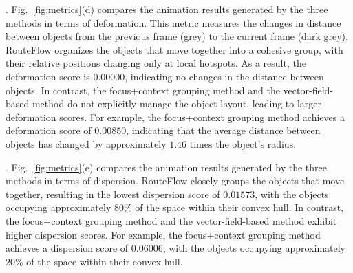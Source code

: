 .
Fig.~\ref{fig:metrics}(d) compares the animation results generated by the three methods in terms of deformation. 
This metric measures the changes in distance between objects from the previous frame (grey) to the current frame (dark grey).
RouteFlow organizes the objects that move together into a cohesive group, with their relative positions changing only at local hotspots.
As a result, the deformation score is $0.00000$, indicating no changes in the distance between objects.
In contrast, the focus+context grouping method and the vector-field-based method do not explicitly manage the object layout, leading to larger deformation scores.
For example, the focus+context grouping method achieves a deformation score of $0.00850$, indicating that the average distance between objects has changed by approximately $1.46$ times the object's radius.



.
Fig.~\ref{fig:metrics}(e) compares the animation results generated by the three methods in terms of dispersion.
RouteFlow closely groups the objects that move together, resulting in the lowest dispersion score of $0.01573$, with the objects occupying approximately $80\%$ of the space within their convex hull.
In contrast, the focus+context grouping method and the vector-field-based method exhibit higher dispersion scores.
For example, the focus+context grouping method achieves a dispersion score of $0.06006$, with the objects occupying approximately $20\%$ of the space within their convex hull.